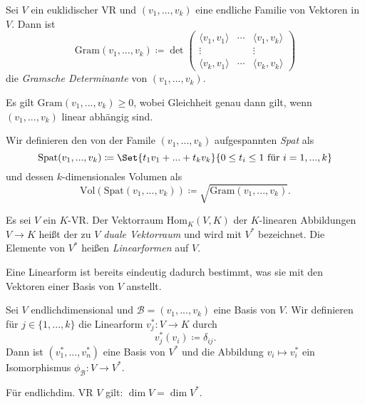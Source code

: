 \documentclass{cheat-sheet}
\newcommand{\Gram}{\mathrm{Gram}}
\newcommand{\Spat}{\mathrm{Spat}}
\newcommand{\Vol}{\mathrm{Vol}}
\newcommand{\Hom}{\mathrm{Hom}}
\newcommand{\BB}{\mathcal{B}}
\begin{document}
\begin{defn}
  Sei $V$ ein euklidischer VR und $(v_1, ..., v_k)$ eine endliche Familie von Vektoren in $V$. Dann ist
  \[ \Gram(v_1, ..., v_k) \coloneqq \det \begin{pmatrix}
  \langle v_1 , v_1 \rangle & \cdots & \langle v_1 , v_k \rangle \\
  \vdots & & \vdots \\
  \langle v_k , v_1 \rangle & \cdots & \langle v_k , v_k \rangle
  \end{pmatrix} \]
  die \emph{Gramsche Determinante} von $(v_1, ..., v_k)$.
\end{defn}

\begin{satz}
  Es gilt $\Gram(v_1, ..., v_k) \ge 0$, wobei Gleichheit genau dann gilt, wenn $(v_1, ..., v_k)$ linear abhängig sind.
\end{satz}

\begin{defn}
  Wir definieren den von der Famile $(v_1, ..., v_k)$ aufgespannten \emph{Spat} als
  \[ \Spat(v_1, ..., v_k) \coloneqq \Set{ t_1 v_1 + ... + t_k v_k }{ 0 \le t_i \le 1 \text{ für } i = 1, ..., k } \]
  und dessen $k$-dimensionales Volumen als
  \[ \Vol(\Spat(v_1, ..., v_k)) \coloneqq \sqrt{ \Gram(v_1, ..., v_k) }. \]
\end{defn}

\begin{defn}
  Es sei $V$ ein $K$-VR. Der Vektorraum $\Hom_K(V, K)$ der $K$-linearen Abbildungen $V \to K$ heißt der zu $V$ \emph{duale Vektorraum} und wird mit $V^*$ bezeichnet. Die Elemente von $V^*$ heißen \emph{Linearformen} auf $V$.
\end{defn}

\begin{bem}
  Eine Linearform ist bereits eindeutig dadurch bestimmt, was sie mit den Vektoren einer Basis von $V$ anstellt.
\end{bem}

\begin{satz}
  Sei $V$ endlichdimensional und $\BB = (v_1, ..., v_k)$ eine Basis von $V$. Wir definieren für $j \in \{ 1, ..., k \}$ die Linearform $v_j^* : V \to K$ durch
  \[ v_j^*(v_i) \coloneqq \delta_{ij}. \]
  Dann ist $(v_1^*, ..., v_n^*)$ eine Basis von $V^*$ und die Abbildung $v_i \mapsto v_i^*$ ein Isomorphismus $\phi_{\BB} : V \to V^*$.
\end{satz}

\begin{kor}
  Für endlichdim. VR $V$ gilt: $\dim V = \dim V^*$.
\end{kor}
\end{document}
